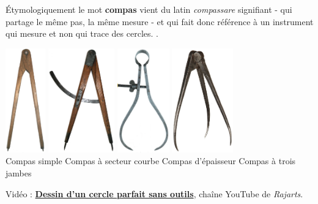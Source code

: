 \begin{debat}
   Étymologiquement le mot {\bf compas} vient du latin {\it compassare} signifiant - qui partage le même pas, la même mesure - et qui fait donc référence à un instrument qui mesure et non qui trace des cercles.
   . \\
   \begin{center}
      \small
      \includegraphics[height=4.5cm]{compas_simple}
      \qquad
      \includegraphics[height=4.5cm]{compas_secteur}
      \qquad
      \includegraphics[height=4.5cm]{compas_epaisseur}
      \qquad
      \includegraphics[height=4.5cm]{compas_3jambes} \\
      Compas simple \quad Compas à secteur courbe \; Compas d'épaisseur \quad Compas à trois jambes
   \end{center}
   \bigskip
   \begin{cadre}[B2][F4]
      \begin{center}
         Vidéo : \href{https://www.youtube.com/watch?v=gXOW4e708Hs&vl=fr}{\bf Dessin d'un cercle parfait sans outils}, chaîne YouTube de {\it Rajarts}.      \end{center}
   \end{cadre}
\end{debat}

